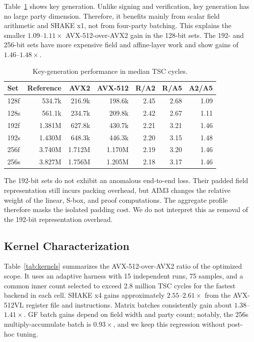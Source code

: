 Table~\ref{tab:keypair} shows key generation.  Unlike signing and verification,
key generation has no large party dimension.  Therefore, it benefits mainly
from scalar field arithmetic and SHAKE x1, not from four-party batching.  This
explains the smaller $1.09$--$1.11\times$ AVX-512-over-AVX2 gain in the 128-bit
sets.  The 192- and 256-bit sets have more expensive field and affine-layer
work and show gains of $1.46$--$1.48\times$.

\begin{table}[t]
\centering
\caption{Key-generation performance in median TSC cycles.}
\label{tab:keypair}
\small
\setlength{\tabcolsep}{5pt}
\begin{tabular}{lrrrrrr}
\toprule
Set & Reference & AVX2 & AVX-512 & R/A2 & R/A5 & A2/A5\\
\midrule
128f & 534.7k & 216.9k & 198.6k & 2.45 & 2.68 & 1.09\\
128s & 561.1k & 234.7k & 209.8k & 2.42 & 2.67 & 1.11\\
192f & 1.381M & 627.8k & 430.7k & 2.21 & 3.21 & 1.46\\
192s & 1.430M & 648.3k & 446.3k & 2.20 & 3.15 & 1.48\\
256f & 3.740M & 1.712M & 1.170M & 2.19 & 3.20 & 1.46\\
256s & 3.827M & 1.756M & 1.205M & 2.18 & 3.17 & 1.46\\
\bottomrule
\end{tabular}
\end{table}

The 192-bit sets do not exhibit an anomalous end-to-end loss.  Their padded
field representation still incurs packing overhead, but AIM3 changes the
relative weight of the linear, S-box, and proof computations.  The aggregate
profile therefore masks the isolated padding cost.  We do not interpret this
as removal of the 192-bit representation overhead.

\subsection{Kernel Characterization}
\label{sec:kernels}

Table~\ref{tab:kernels} summarizes the AVX-512-over-AVX2 ratio of the optimized
scope.  It uses an adaptive harness with 15 independent runs, 75 samples, and a
common inner count selected to exceed 2.8 million TSC cycles for the fastest
backend in each cell.  SHAKE x4 gains approximately $2.55$--$2.61\times$ from
the AVX-512VL register file and instructions.  Matrix batches consistently gain
about $1.38$--$1.41\times$.  GF batch gains depend on field width and party
count; notably, the 256s multiply-accumulate batch is $0.93\times$, and we keep
this regression without post-hoc tuning.

